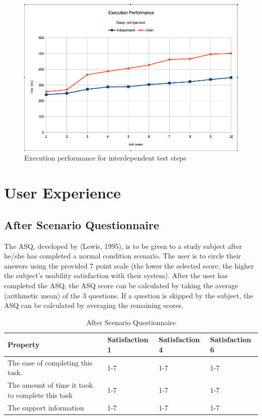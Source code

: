 \begin{figure}[ht]
	\label{fig:ef}
	\centering
	\includegraphics[width=\textwidth]{grafiken/exec_deep}
	\caption{Execution performance for interdependent test steps}
\end{figure}

\section{User Experience}
\subsection{After Scenario Questionnaire}
The ASQ, developed by (Lewis, 1995), is to be given to a study subject after he/she has completed a normal condition scenario. The user is to circle their answers using the provided 7 point scale (the lower the selected score, the higher the subject’s usability satisfaction with their system). After the user has completed the ASQ, the ASQ score can be calculated by taking the average (arithmetic mean) of the 3 questions. If a question is skipped by the subject, the ASQ can be calculated by averaging the remaining scores.
\begin{table}[h]
	\begin{center}
		\begin{tabular}{| l | l | l | l |}
			\hline
			\textbf{Property} & \textbf{Satisfaction 1 }  & \textbf{Satisfaction 4 } & \textbf{Satisfaction 6 }\\
			\hline
			The ease of completing this task. & 1-7  & 1-7 & 1-7 \\
			\hline
			The amount of time it took to complete this task & 1-7 & 1-7 & 1-7 \\
			\hline
			The support information  & 1-7 & 1-7 & 1-7 \\
			\hline
		\end{tabular}
	\end{center}
	\caption{After Scenario Questionnaire}
\end{table}

